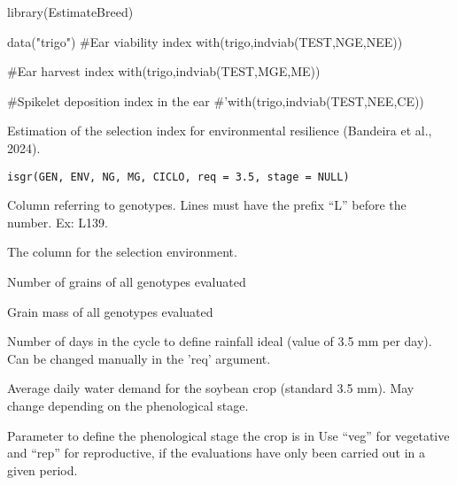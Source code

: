 \documentclass[a4paper]{book}
\begin{document}
%
\begin{Examples}
\begin{ExampleCode}

library(EstimateBreed)

data("trigo")
#Ear viability index
with(trigo,indviab(TEST,NGE,NEE))

#Ear harvest index
with(trigo,indviab(TEST,MGE,ME))

#Spikelet deposition index in the ear
#'with(trigo,indviab(TEST,NEE,CE))

\end{ExampleCode}
\end{Examples}
%
\begin{Description}
Estimation of the selection index for environmental resilience
(Bandeira et al., 2024).
\end{Description}
%
\begin{Usage}
\begin{verbatim}
isgr(GEN, ENV, NG, MG, CICLO, req = 3.5, stage = NULL)
\end{verbatim}
\end{Usage}
%
\begin{Arguments}
\begin{ldescription}
\item[\code{GEN}] Column referring to genotypes. Lines must have the prefix “L” before
the number. Ex: L139.

\item[\code{ENV}] The column for the selection environment.

\item[\code{NG}] Number of grains of all genotypes evaluated

\item[\code{MG}] Grain mass of all genotypes evaluated

\item[\code{CICLO}] Number of days in the cycle to define rainfall
ideal (value of 3.5 mm per day). Can be changed manually in the 'req' argument.

\item[\code{req}] Average daily water demand for the soybean crop (standard 3.5 mm).
May change depending on the phenological stage.

\item[\code{stage}] Parameter to define the phenological stage the crop is in
Use “veg” for vegetative and “rep” for reproductive, if the
evaluations have only been carried out in a given period.
\end{ldescription}
\end{Arguments}
\end{document}
